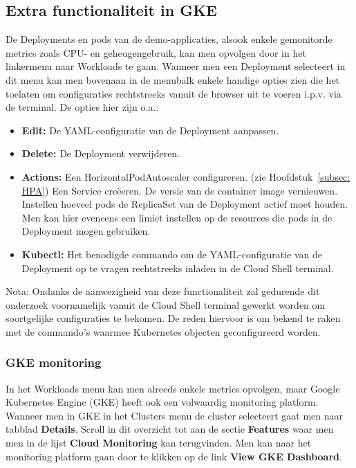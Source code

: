 \subsection{Extra functionaliteit in GKE}
\label{subsec:extrafuncgke}
De Deployments en pods van de demo-applicaties, alsook enkele gemonitorde metrics zoals CPU- en geheugengebruik, kan men opvolgen door in het linkermenu naar Workloads te gaan. Wanneer men een Deployment selecteert in dit menu kan men bovenaan in de menubalk enkele handige opties zien die het toelaten om configuraties rechtstreeks vanuit de browser uit te voeren i.p.v. via de terminal. De opties hier zijn o.a.:
\begin{itemize}
    \item {\bf Edit:} De YAML-configuratie van de Deployment aanpassen.
    \item {\bf Delete:} De Deployment verwijderen.
    \item {\bf Actions:} 
         Een HorizontalPodAutoscaler configureren. (zie Hoofdstuk~\ref{subsec: HPA}) 
         Een Service creëeren.
         De versie van de container image vernieuwen.
         Instellen hoeveel pods de ReplicaSet van de Deployment actief moet houden. Men kan hier eveneens een limiet instellen op de resources die pods in de Deployment mogen gebruiken. 
    \item {\bf Kubectl:} Het benodigde commando om de YAML-configuratie van de Deployment op te vragen rechtstreeks inladen in de Cloud Shell terminal.
\end{itemize}

Nota: Ondanks de aanwezigheid van deze functionaliteit zal gedurende dit onderzoek voornamelijk vanuit de Cloud Shell terminal gewerkt worden om soortgelijke configuraties te bekomen. De reden hiervoor is om bekend te raken met de commando's waarmee Kubernetes objecten geconfigureerd worden.

\subsubsection{GKE monitoring}

In het Workloads menu kan men alreeds enkele metrics opvolgen, maar Google Kubernetes Engine (GKE) heeft ook een volwaardig monitoring platform. Wanneer men in GKE in het Clusters menu de cluster selecteert gaat men naar tabblad {\bf Details}. Scroll in dit overzicht tot aan de sectie {\bf Features} waar men men in de lijst {\bf Cloud Monitoring} kan terugvinden. Men kan naar het monitoring platform gaan door te klikken op de link {\bf View GKE Dashboard}.

